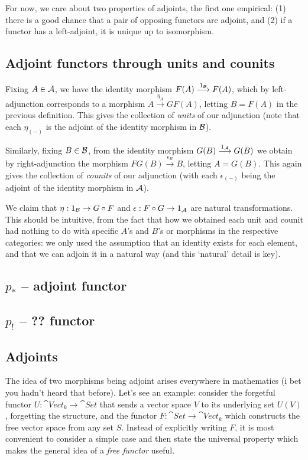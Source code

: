 For now, we care about two properties of adjoints, the first one empirical: (1) there is a good chance that a pair of opposing functors are adjoint, and (2) if a functor has a left-adjoint, it is unique up to isomorphism.


\subsection{Adjoint functors through units and counits}
Fixing $A\in\mathcal{A}$, we have the identity morphism $F(A) \overset{1_{\mathcal{B}}}{\longrightarrow} F(A)$, which by left-adjunction corresponds to a morphism $A \overset{\eta_A}{\longrightarrow} GF(A)$, letting $B=F(A)$ in the previous definition. This gives the collection of \emph{units} of our adjunction (note that each $\eta_{(-)}$ is the adjoint of the identity morphism in $\mathcal{B}$).

Similarly, fixing $B\in\mathcal{B}$, from the identity morphism $G(B) \overset{1_{\mathcal{A}}}{\longrightarrow} G(B)$ we obtain by right-adjunction the morphism $FG(B) \overset{\epsilon_B}{\longrightarrow} B$, letting $A=G(B)$. This again gives the collection of \emph{counits} of our adjunction (with each $\epsilon_{(-)}$ being the adjoint of the identity morphism in $\mathcal{A}$).

We claim that $\eta : 1_{\mathcal{B}} \to G\circ F$ and $\epsilon : F\circ G \to 1_{\mathcal{A}}$ are natural transformations. This should be intuitive, from the fact that how we obtained each unit and counit had nothing to do with specific $A$'s and $B$'s or morphisms in the respective categories: we only used the assumption that an identity exists for each element, and that we can adjoin it in a natural way (and this `natural' detail is key).

\subsection{$p_*$ -- adjoint functor}

\subsection{$p_!$ -- ?? functor}

\subsection{Adjoints}
The idea of two morphisms being adjoint arises everywhere in mathematics (i bet you hadn't heard that before). Let's see an example: consider the forgetful functor $U:\cat{Vect_k}\to\cat{Set}$ that sends a vector space $V$ to its underlying set $U(V)$, forgetting the structure, and the functor $F:\cat{Set}\to\cat{Vect_k}$ which constructs the free vector space from any set $S$. Instead of explicitly writing $F$, it is most convenient to consider a simple case and then state the universal property which makes the general idea of a \emph{free functor} useful.

